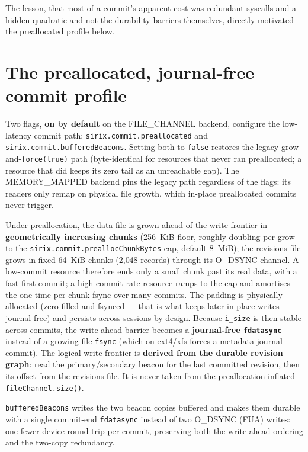 \documentclass[11pt,a4paper,oneside]{report}
\theoremstyle{sirixthm}
\newcommand{\code}[1]{\texttt{#1}}
\begin{document}
The lesson, that most of a commit's apparent cost was redundant syscalls and a hidden
quadratic and not the durability barriers themselves, directly motivated the preallocated
profile below.

\section{The preallocated, journal-free commit profile}
\label{sec:prealloc}

Two flags, \textbf{on by default} on the FILE\_CHANNEL backend, configure the low-latency
commit path: \code{sirix.commit.preallocated} and \code{sirix.commit.bufferedBeacons}. Setting
both to \code{false} restores the legacy grow-and-\code{force(true)} path (byte-identical for
resources that never ran preallocated; a resource that did keeps its zero tail as an unreachable
gap). The MEMORY\_MAPPED backend pins the legacy path regardless of the flags: its readers only
remap on physical file growth, which in-place preallocated commits never trigger.

Under preallocation, the data file is grown ahead of the write frontier in
\textbf{geometrically increasing chunks} (256~KiB floor, roughly doubling per grow to the
\code{sirix.commit.preallocChunkBytes} cap, default 8~MiB); the revisions file grows in fixed
64~KiB chunks (2{,}048 records) through its O\_DSYNC channel. A low-commit resource therefore
ends only a small chunk past its real data, with a fast first commit; a high-commit-rate
resource ramps to the cap and amortises the one-time per-chunk fsync over many commits. The
padding is physically allocated (zero-filled and fsynced — that is what keeps later in-place
writes journal-free) and persists across sessions by design.
Because \code{i\_size} is then stable across commits, the write-ahead barrier becomes a
\textbf{journal-free \code{fdatasync}} instead of a growing-file \code{fsync} (which on
ext4/xfs forces a metadata-journal commit). The logical write frontier is \textbf{derived
from the durable revision graph}: read the primary/secondary beacon for the last
committed revision, then its offset from the revisions file. It is never taken from the
preallocation-inflated \code{fileChannel.size()}.

\code{bufferedBeacons} writes the two beacon copies buffered and makes them durable with a
single commit-end \code{fdatasync} instead of two O\_DSYNC (FUA) writes: one fewer
device round-trip per commit, preserving both the write-ahead ordering and the two-copy
redundancy.
\end{document}
